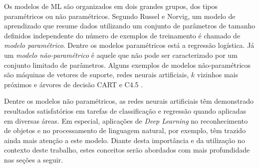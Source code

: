 Os modelos de ML são organizados em dois grandes grupos, dos tipos paramétricos ou não paramétricos. Segundo Russel e Norvig, um modelo de aprendizado que resume dados utilizando um conjunto de parâmetros de tamanho definidos independente do número de exemplos de treinamento é chamado de \emph{modelo paramétrico}. Dentre os modelos paramétricos está a regressão logística. Já um \emph{modelo não-paramétrico} é aquele que não pode ser caracterizado por um conjunto limitado de parâmetros. Alguns exemplos de modelos não-paramétricos são máquinas de vetores de suporte, redes neurais artificiais, $k$ vizinhos mais próximos e árvores de decisão CART e C4.5 \cite{russell2016artificial}.

Dentre os modelos não paramétricos, as redes neurais artificiais têm demonstrado resultados satisfatórios em tarefas de classificação e regressão quando aplicadas em diversas áreas. Em especial, aplicações de \emph{Deep Learning} no reconhecimento de objetos e no processamento de linguagem natural, por exemplo, têm trazido ainda mais atenção a este modelo. Diante desta importância e da utilização no contexto deste trabalho, estes conceitos serão abordados com mais profundidade nas seções a seguir.
